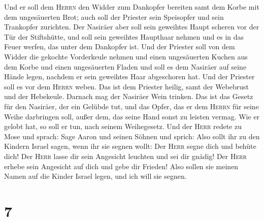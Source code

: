 Und er soll dem \textsc{Herrn} den Widder zum Dankopfer bereiten samt
dem Korbe mit dem ungesäuerten Brot; auch soll der Priester sein
Speisopfer und sein Trankopfer zurichten.  Der Nasiräer
aber soll sein geweihtes Haupt scheren vor der Tür der Stiftshütte, und
soll sein geweihtes Haupthaar nehmen und es in das Feuer werfen, das
unter dem Dankopfer ist.  Und der Priester soll von dem
Widder die gekochte Vorderkeule nehmen und einen ungesäuerten Kuchen aus
dem Korbe und einen ungesäuerten Fladen und soll es dem Nasiräer auf
seine Hände legen, nachdem er sein geweihtes Haar abgeschoren hat.
 Und der Priester soll es vor dem \textsc{Herrn} weben.
Das ist dem Priester heilig, samt der Webebrust und der Hebekeule.
Darnach mag der Nasiräer Wein trinken.  Das ist das
Gesetz für den Nasiräer, der ein Gelübde tut, und das Opfer, das er dem
\textsc{Herrn} für seine Weihe darbringen soll, außer dem, das seine
Hand sonst zu leisten vermag. Wie er gelobt hat, so soll er tun, nach
seinem Weihegesetz.  Und der \textsc{Herr} redete zu Mose
und sprach:  Sage Aaron und seinen Söhnen und sprich:
Also sollt ihr zu den Kindern Israel sagen, wenn ihr sie segnen wollt:
 Der \textsc{Herr} segne dich und behüte dich!
 Der \textsc{Herr} lasse dir sein Angesicht leuchten und
sei dir gnädig!  Der \textsc{Herr} erhebe sein Angesicht
auf dich und gebe dir Frieden!  Also sollen sie meinen
Namen auf die Kinder Israel legen, und ich will sie segnen.

\hypertarget{section-6}{%
\section{7}\label{section-6}}

